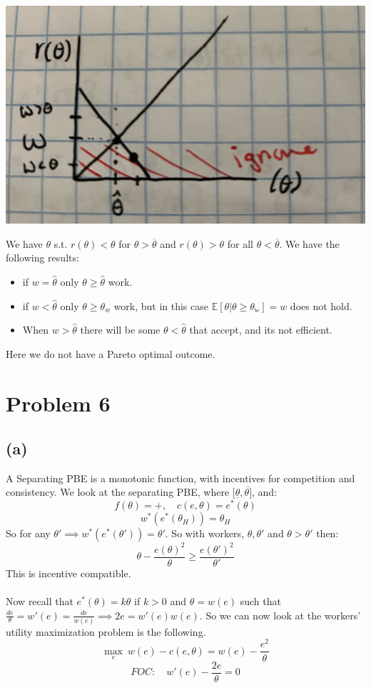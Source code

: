 \documentclass{article}
\begin{document}
\begin{center}
\includegraphics[width=.5\linewidth]{images/IMG_1835.jpg}    
\end{center}


We have $\theta$ s.t. $r(\theta) < \theta $ for $\theta > \overline{\theta}$ and $r(\theta) > \theta$ for all $\theta < \overline{\theta}$. We have the following results: 
\begin{itemize}
    \item if $w = \hat{\theta}$ only $\theta \geq \hat{\theta}$ work.
    \item if $w < \hat{\theta}$ only $\theta \geq \theta_w$ work, but in this case $\mathbb{E[\theta | \theta \geq \theta_w]} = w$ does not hold. 
    \item When $w > \hat{\theta}$ there will be some $\theta < \hat{\theta}$ that accept, and its not efficient.
\end{itemize}

Here we do not have a Pareto optimal outcome. 

\section{Problem 6}

\subsection*{(a)}

A Separating PBE is a monotonic function, with incentives for competition and consistency. We look at the separating PBE, where $[\underline{\theta}, \overline{\theta]}$, and:
\[
f(\theta) = +, \quad  c(e, \theta) = e^*(\theta)
\]
\[
w^*(e^*(\theta_H)) = \theta_H
\]
So for any $\theta' \implies w^*(e^*(\theta')) = \theta'$. So with workers, $\theta, \theta'$ and $\theta > \theta'$ then:
\[
\theta - \frac{e(\theta)^2}{\theta} \geq \frac{e(\theta')^2}{\theta'}
\]
This is incentive compatible. \\
\\
Now recall that $e^*(\theta) = k\theta$ if $k > 0$ and $\theta = w(e)$ such that $\frac{de}{\theta} = w'(e) = \frac{de}{w(e)} \implies 2e = w'(e)w(e)$. So we can now look at the workers’ utility maximization problem is the following.
\[
\max_e \ w(e) - c(e, \theta) = w(e) - \frac{e^2}{\theta}
\]
\[
FOC: \quad w'(e) - \frac{2e}{\theta} = 0
\]
\end{document}
